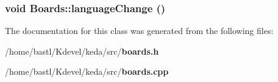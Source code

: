 \subsubsection{\setlength{\rightskip}{0pt plus 5cm}void Boards::language\-Change ()\hspace{0.3cm}{\tt  [protected, virtual, slot]}}\label{classBoards_1182bf5637039731d24c9b1e622b4179}




The documentation for this class was generated from the following files:\begin{CompactItemize}
\item 
/home/bastl/Kdevel/keda/src/{\bf boards.h}\item 
/home/bastl/Kdevel/keda/src/{\bf boards.cpp}\end{CompactItemize}
